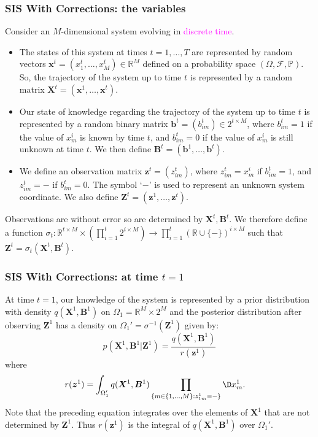 \documentclass[9pt, xcolor={dvipsnames,svgnames,table}]{beamer}
\newcommand{\F}{\mathcal{F}}
\renewcommand{\P}{\mathbb{P}}
\newcommand{\Real}{\mathbb R}
\begin{document}
\begin{frame}
    \frametitle{SIS With Corrections: the variables}
    Consider an $M$-dimensional system evolving in \textcolor{Fuchsia}{discrete time}.
    \begin{itemize}
        \item The \textcolor{PineGreen}{states of this system} at times $t = 1, \dots, T$ are represented by random vectors $\bm{x}^t = (x^t_1, \dots, x^t_M) \in \Real^M$ defined on a probability space $(\Omega, \F, \P)$. So, the \textcolor{PineGreen}{trajectory of the system} up to time $t$ is represented by a random matrix $\bm{X}^t = (\bm{x}^1, \ldots, \bm{x}^t)$. 
        \item Our \textcolor{PineGreen}{state of knowledge} regarding the trajectory of the system up to time $t$ is represented by a random binary matrix $\bm{b}^t = (b^t_{im}) \in 2^{t \times M}$, where $b^t_{im} = 1$ if the value of $x^i_m$ is known by time $t$, and $b^t_{im} = 0$ if the value of $x^i_m$ is still unknown at time $t$. We then define $\bm{B}^t = (\bm{b}^1,\ldots,\bm{b}^t)$.
        \item We define an \textcolor{PineGreen}{observation matrix} $\bm{z}^t = (z^t_{im})$, where $z^t_{im} = x^i_m$ if $b^t_{im} = 1$, and $z^t_{im} = -$ if $b^t_{im} = 0$. The symbol `$-$' is used to represent an unknown system coordinate. We also define $\bm{Z}^t = (\bm{z}^1,\ldots,\bm{z}^t)$.
    \end{itemize}
Observations are without error so are determined by $\bm{X}^t, \bm{B}^t$. We therefore define a function $\sigma_t: \Real^{t \times M} \times \left( \prod_{i=1}^t 2^{i \times M} \right) \rightarrow \prod_{i=1}^t (\Real \cup \{ - \})^{i \times M}$ such that $\bm{Z}^t = \sigma_t(\bm{X}^t, \bm{B}^t)$.
\end{frame}

\begin{frame}
    \frametitle{SIS With Corrections: at time $t=1$}
    At time $t=1$, our knowledge of the system is represented by a prior distribution with density $q(\bm{X}^1, \bm{B}^1)$ on $\Omega_1 = \Real^M \times 2^M$ and the posterior distribution after observing $\bm{Z}^1$ has a density on $\Omega_1' = \sigma^{-1}(\bm{Z}^1)$ given by:
    \begin{equation*}
        p(\bm{X}^1, \bm{B}^1 |\bm{Z}^1) = \frac{q(\bm{X}^1, \bm{B}^1)} {r(\bm{z}^1)} 
    \end{equation*}
    where
    \begin{align*}
        r(\bm{z}^1)  &= \int_{\Omega_1'} q(\bm{X}^1, \bm{B}^1) \prod_{ \{m \in \{1, \ldots, M \} : z^1_{1m} = - \} } \D x^1_m.
    \end{align*}
    Note that the preceding equation integrates over the elements of $\bm{X}^1$ that are not determined by $\bm{Z}^1$. Thus $r(\bm{z}^1)$ is the integral of $q(\bm{X}^1, \bm{B}^1)$ over $\Omega_1'$. 
\end{frame}
\end{document}
